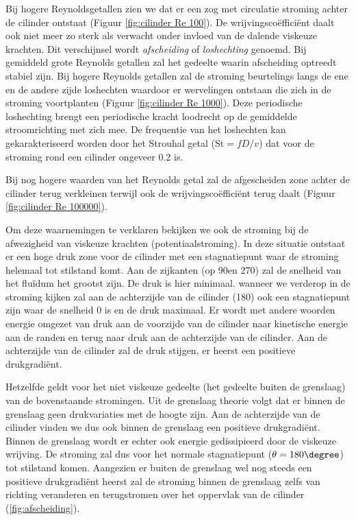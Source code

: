 Bij hogere Reynoldsgetallen zien we dat er een zog met circulatie stroming achter de cilinder ontstaat (Figuur \ref{fig:cilinder Re 100}). De wrijvingscoëfficiënt daalt ook niet meer zo sterk als verwacht onder invloed van de dalende viskeuze krachten. Dit verschijnsel wordt \emph{afscheiding} of \emph{loshechting} genoemd. Bij gemiddeld grote Reynolds getallen zal het gedeelte waarin afscheiding optreedt stabiel zijn. Bij hogere Reynolds getallen zal de stroming beurtelings langs de ene en de andere zijde loshechten waardoor er wervelingen ontstaan die zich in de stroming voortplanten (Figuur \ref{fig:cilinder Re 1000}). Deze periodische loshechting brengt een periodische kracht loodrecht op de gemiddelde stroomrichting met zich mee. De frequentie van het loshechten kan gekarakteriseerd worden door het Strouhal getal ($\text{St} = fD/v$) dat voor de stroming rond een cilinder ongeveer 0.2 is.

Bij nog hogere waarden van het Reynolds getal zal de afgescheiden zone achter de cilinder terug verkleinen terwijl ook de wrijvingscoëfficiënt terug daalt (Figuur \ref{fig:cilinder Re 100000}).

Om deze waarnemingen te verklaren bekijken we ook de stroming bij de afwezigheid van viskeuze krachten (potentiaalstroming). In deze situatie ontstaat er een hoge druk zone voor de cilinder met een stagnatiepunt waar de stroming helemaal tot stilstand komt. Aan de zijkanten (op 90\degree en 270\degree) zal de snelheid van het fluïdum het grootst zijn. De druk is hier minimaal. wanneer we verderop in de stroming kijken zal aan de achterzijde van de cilinder (180\degree) ook een stagnatiepunt zijn waar de snelheid $0$ is en de druk maximaal. Er wordt met andere woorden energie omgezet van druk aan de voorzijde van de cilinder naar kinetische energie aan de randen en terug naar druk aan de achterzijde van de cilinder. Aan de achterzijde van de cilinder zal de druk stijgen, er heerst een positieve drukgradiënt.

Hetzelfde geldt voor het niet viskeuze gedeelte (het gedeelte buiten de grenslaag) van de bovenstaande stromingen. Uit de grenslaag theorie volgt dat er binnen de grenslaag geen drukvariaties met de hoogte zijn. Aan de achterzijde van de cilinder vinden we dus ook binnen de grenslaag een positieve drukgradiënt. Binnen de grenslaag wordt er echter ook energie gedissipieerd door de viskeuze wrijving. De stroming zal dus voor het normale stagnatiepunt ($\theta = 180\degree$) tot stilstand komen. Aangezien er buiten de grenslaag wel nog steeds een positieve drukgradiënt heerst zal de stroming binnen de grenslaag zelfs van richting veranderen en terugstromen over het oppervlak van de cilinder (\ref{fig:afscheiding}).

